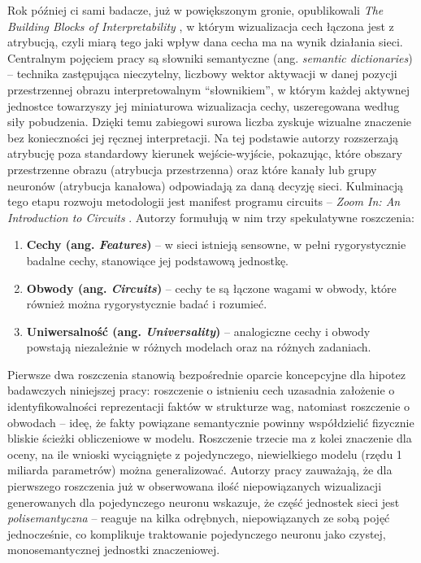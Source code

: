 Rok później ci sami badacze, już w powiększonym gronie, opublikowali \textit{The Building Blocks of Interpretability} \cite{olah_2018_building_blocks_interpretability}, w którym wizualizacja cech łączona jest z atrybucją, czyli miarą tego jaki wpływ dana cecha ma na wynik działania sieci. Centralnym pojęciem pracy są słowniki semantyczne (ang. \textit{semantic dictionaries}) -- technika zastępująca nieczytelny, liczbowy wektor aktywacji w danej pozycji przestrzennej obrazu interpretowalnym \enquote{słownikiem}, w którym każdej aktywnej jednostce towarzyszy jej miniaturowa wizualizacja cechy, uszeregowana według siły pobudzenia. Dzięki temu zabiegowi surowa liczba zyskuje wizualne znaczenie bez konieczności jej ręcznej interpretacji. Na tej podstawie autorzy rozszerzają atrybucję poza standardowy kierunek wejście-wyjście, pokazując, które obszary przestrzenne obrazu (atrybucja przestrzenna) oraz które kanały lub grupy neuronów (atrybucja kanałowa) odpowiadają za daną decyzję sieci. \newline
Kulminacją tego etapu rozwoju metodologii jest manifest programu circuits -- \textit{Zoom In: An Introduction to Circuits} \cite{olah_2020_zoom_in_circuits}. Autorzy formułują w nim trzy spekulatywne roszczenia:
\begin{enumerate}
    \item \textbf{Cechy (ang. \textit{Features})} -- w sieci istnieją sensowne, w pełni rygorystycznie badalne cechy, stanowiące jej podstawową jednostkę.
    \item \textbf{Obwody (ang. \textit{Circuits})} -- cechy te są łączone wagami w obwody, które również można rygorystycznie badać i rozumieć.
    \item \textbf{Uniwersalność (ang. \textit{Universality})} -- analogiczne cechy i obwody powstają niezależnie w różnych modelach oraz na różnych zadaniach.
\end{enumerate}
Pierwsze dwa roszczenia stanowią bezpośrednie oparcie koncepcyjne dla hipotez badawczych niniejszej pracy: roszczenie o istnieniu cech uzasadnia założenie o identyfikowalności reprezentacji faktów w strukturze wag, natomiast roszczenie o obwodach -- ideę, że fakty powiązane semantycznie powinny współdzielić fizycznie bliskie ścieżki obliczeniowe w modelu. Roszczenie trzecie ma z kolei znaczenie dla oceny, na ile wnioski wyciągnięte z pojedynczego, niewielkiego modelu (rzędu 1 miliarda parametrów) można generalizować. Autorzy pracy zauważają, że dla pierwszego roszczenia już w \cite{olah_2017_feature_visualization} obserwowana ilość niepowiązanych wizualizacji generowanych dla pojedynczego neuronu wskazuje, że część jednostek sieci jest \textit{polisemantyczna} -- reaguje na kilka odrębnych, niepowiązanych ze sobą pojęć jednocześnie, co komplikuje traktowanie pojedynczego neuronu jako czystej, monosemantycznej jednostki znaczeniowej. \newline
